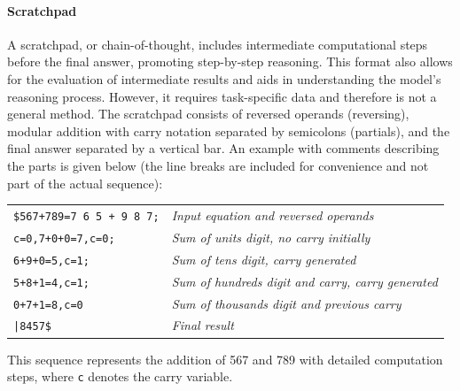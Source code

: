 \paragraph{Scratchpad}\label{par:scratchpad}
A scratchpad, or chain-of-thought, includes intermediate computational steps before the final answer, promoting step-by-step reasoning. This format also allows for the evaluation of intermediate results and aids in understanding the model's reasoning process. However, it requires task-specific data and therefore is not a general method. The scratchpad consists of reversed operands (reversing), modular addition with carry notation separated by semicolons (partials), and the final answer separated by a vertical bar. An example with comments describing the parts is given below (the line breaks are included for convenience and not part of the actual sequence):
\begin{center}
  \begin{tabular}{l l}
    \verb|$567+789=7 6 5 + 9 8 7;| & \textit{Input equation and reversed operands}             \\
    \verb|c=0,7+0+0=7,c=0;|        & \textit{Sum of units digit, no carry initially}           \\
    \verb|6+9+0=5,c=1;|            & \textit{Sum of tens digit, carry generated}               \\
    \verb|5+8+1=4,c=1;|            & \textit{Sum of hundreds digit and carry, carry generated} \\
    \verb|0+7+1=8,c=0|             & \textit{Sum of thousands digit and previous carry}        \\
    \texttt{|8457\$}               & \textit{Final result}
  \end{tabular}
\end{center}

This sequence represents the addition of 567 and 789 with detailed computation steps, where \texttt{c} denotes the carry variable.



